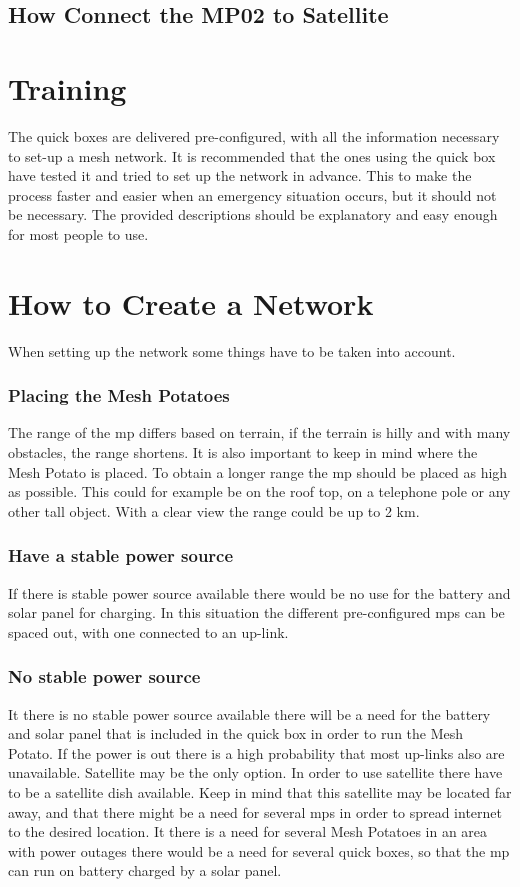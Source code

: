 

 

\subsection{How Connect the MP02 to Satellite}


\section{Training}
The \gls{quick} boxes are delivered pre-configured, with all the  information necessary to set-up a mesh network. It is recommended that the ones using the \gls{quick} box have tested it and tried to set up the network in advance. This to make the process faster and easier when an emergency situation occurs, but it should not be necessary. The provided descriptions should be explanatory and easy enough for most people to use.


\section{How to Create a Network}
When setting up the network some things have to be taken into account. 

\subsubsection{Placing the Mesh Potatoes}
The range of the \gls{mp} differs based on terrain, if the terrain is hilly and with many obstacles, the range shortens. It is also important to keep in mind where the Mesh Potato is placed. To obtain a longer range the \gls{mp} should be placed as high as possible. This could for example be on the roof top, on a telephone pole or any other tall object. With a clear view the range could be up to 2 km. 

\subsubsection{Have a stable power source}
If there is stable power source available there would be no use for the battery and solar panel for charging. In this situation the different pre-configured \glspl{mp} can be spaced out, with one connected to an up-link. 

\subsubsection{No stable power source}
It there is no stable power source available there will be a need for the battery and solar panel that is included in the \gls{quick} box in order to run the Mesh Potato. If the power is out there is a high probability that most up-links also are unavailable. Satellite may be the only option. In order to use satellite there have to be a satellite dish available. Keep in mind that this satellite may be located far away, and that there might be a need for several \glspl{mp} in order to spread internet to the desired location. It there is a need for several Mesh Potatoes in an area with power outages there would be a need for several \gls{quick} boxes, so that the \gls{mp} can run on battery charged by a solar panel. 
